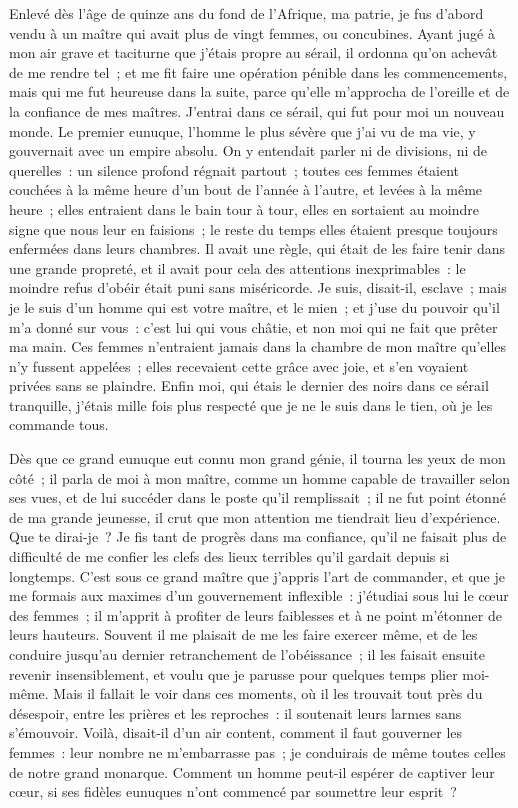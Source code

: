 \documentclass[french,twoside]{book} %
\begin{document}
Enlevé dès l’âge de quinze ans du fond de l’Afrique, ma patrie, je fus d’abord vendu à un maître qui avait plus de vingt femmes, ou concubines. Ayant jugé à mon air grave et taciturne que j’étais propre au sérail, il ordonna qu’on achevât de me rendre tel ; et me fit faire une opération pénible dans les commencements, mais qui me fut heureuse dans la suite, parce qu’elle m’approcha de l’oreille et de la confiance de mes maîtres. J’entrai dans ce sérail, qui fut pour moi un nouveau monde. Le premier eunuque, l’homme le plus sévère que j’ai vu de ma vie, y gouvernait avec un empire absolu. On y entendait parler ni de divisions, ni de querelles : un silence profond régnait partout ; toutes ces femmes étaient couchées à la même heure d’un bout de l’année à l’autre, et levées à la même heure ; elles entraient dans le bain tour à tour, elles en sortaient au moindre signe que nous leur en faisions ; le reste du temps elles étaient presque toujours enfermées dans leurs chambres. Il avait une règle, qui était de les faire tenir dans une grande propreté, et il avait pour cela des attentions inexprimables : le moindre refus d’obéir était puni sans miséricorde. Je suis, disait-il, esclave ; mais je le suis d’un homme qui est votre maître, et le mien ; et j’use du pouvoir qu’il m’a donné sur vous : c’est lui qui vous châtie, et non moi qui ne fait que prêter ma main. Ces femmes n’entraient jamais dans la chambre de mon maître qu’elles n’y fussent appelées ; elles recevaient cette grâce avec joie, et s’en voyaient privées sans se plaindre. Enfin moi, qui étais le dernier des noirs dans ce sérail tranquille, j’étais mille fois plus respecté que je ne le suis dans le tien, où je les commande tous.\par
Dès que ce grand eunuque eut connu mon grand génie, il tourna les yeux de mon côté ; il parla de moi à mon maître, comme un homme capable de travailler selon ses vues, et de lui succéder dans le poste qu’il remplissait ; il ne fut point étonné de ma grande jeunesse, il crut que mon attention me tiendrait lieu d’expérience. Que te dirai-je ? Je fis tant de progrès dans ma confiance, qu’il ne faisait plus de difficulté de me confier les clefs des lieux terribles qu’il gardait depuis si longtemps. C’est sous ce grand maître que j’appris l’art de commander, et que je me formais aux maximes d’un gouvernement inflexible : j’étudiai sous lui le cœur des femmes ; il m’apprit à profiter de leurs faiblesses et à ne point m’étonner de leurs hauteurs. Souvent il me plaisait de me les faire exercer même, et de les conduire jusqu’au dernier retranchement de l’obéissance ; il les faisait ensuite revenir insensiblement, et voulu que je parusse pour quelques temps plier moi-même. Mais il fallait le voir dans ces moments, où il les trouvait tout près du désespoir, entre les prières et les reproches : il soutenait leurs larmes sans s’émouvoir. Voilà, disait-il d’un air content, comment il faut gouverner les femmes : leur nombre ne m’embarrasse pas ; je conduirais de même toutes celles de notre grand monarque. Comment un homme peut-il espérer de captiver leur cœur, si ses fidèles eunuques n’ont commencé par soumettre leur esprit ?\par
\end{document}
